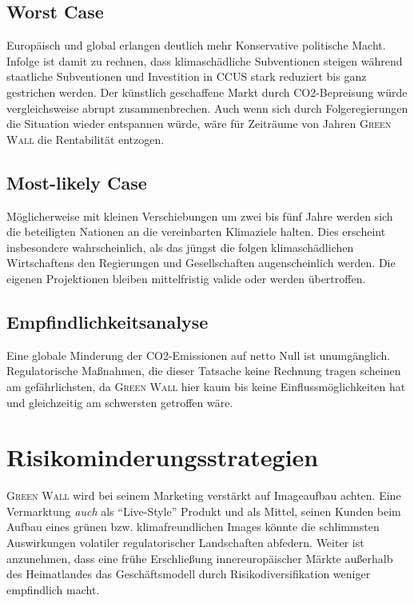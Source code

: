 \subsection{Worst Case}

Europäisch und global erlangen deutlich mehr Konservative politische Macht.
Infolge ist damit zu rechnen, dass klimaschädliche Subventionen steigen während staatliche Subventionen und Investition in CCUS stark reduziert bis ganz gestrichen werden.
Der künstlich geschaffene Markt durch CO2-Bepreisung würde vergleichsweise abrupt zusammenbrechen.
Auch wenn sich durch Folgeregierungen die Situation wieder entspannen würde, wäre für Zeiträume von Jahren \textsc{Green Wall} die Rentabilität entzogen.

\subsection{Most-likely Case}

Möglicherweise mit kleinen Verschiebungen um zwei bis fünf Jahre werden sich die beteiligten Nationen an die vereinbarten Klimaziele halten.
Dies erscheint insbesondere wahrscheinlich, als das jüngst die folgen klimaschädlichen Wirtschaftens den Regierungen und Gesellschaften augenscheinlich werden.
Die eigenen Projektionen bleiben mittelfristig valide oder werden übertroffen.

\subsection{Empfindlichkeitsanalyse}

Eine globale Minderung der CO2-Emissionen auf netto Null ist unumgänglich.
Regulatorische Maßnahmen, die dieser Tatsache keine Rechnung tragen scheinen am gefährlichsten, da \textsc{Green Wall} hier kaum bis keine Einflussmöglichkeiten hat und gleichzeitig am schwersten getroffen wäre.\par\medskip
%


\section{Risikominderungsstrategien}

\textsc{Green Wall} wird bei seinem Marketing verstärkt auf Imageaufbau achten.
Eine Vermarktung \textit{auch} als ``Live-Style'' Produkt und als Mittel, seinen Kunden beim Aufbau eines grünen bzw. klimafreundlichen Images könnte die schlimmsten Auswirkungen volatiler regulatorischer Landschaften abfedern.
Weiter ist anzunehmen, dass eine frühe Erschließung innereuropäischer Märkte außerhalb des Heimatlandes das Geschäftsmodell durch Risikodiversifikation weniger empfindlich macht.

